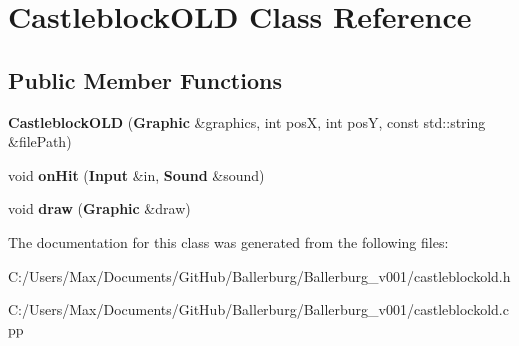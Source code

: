 \section{Castleblock\+O\+L\+D Class Reference}
\label{class_castleblock_o_l_d}
\subsection*{Public Member Functions}
\begin{DoxyCompactItemize}
\item 
{\bfseries Castleblock\+O\+L\+D} ({\bf Graphic} \&graphics, int pos\+X, int pos\+Y, const std\+::string \&file\+Path)\label{class_castleblock_o_l_d_a8ad1f97522837dec4a32a13191f903a4}

\item 
void {\bfseries on\+Hit} ({\bf Input} \&in, {\bf Sound} \&sound)\label{class_castleblock_o_l_d_a544647c3b75536335078646b18e47ccb}

\item 
void {\bfseries draw} ({\bf Graphic} \&draw)\label{class_castleblock_o_l_d_a21f1c02d6abdd9608fab3be81d4c7361}

\end{DoxyCompactItemize}


The documentation for this class was generated from the following files\+:\begin{DoxyCompactItemize}
\item 
C\+:/\+Users/\+Max/\+Documents/\+Git\+Hub/\+Ballerburg/\+Ballerburg\+\_\+v001/castleblockold.\+h\item 
C\+:/\+Users/\+Max/\+Documents/\+Git\+Hub/\+Ballerburg/\+Ballerburg\+\_\+v001/castleblockold.\+cpp\end{DoxyCompactItemize}
